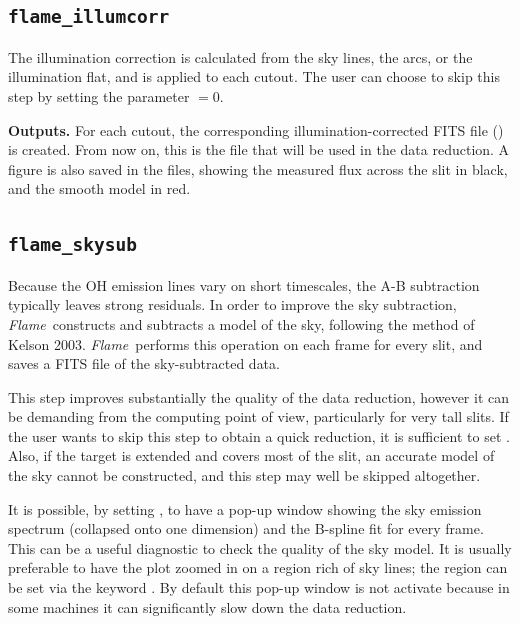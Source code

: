 \documentclass[a4paper]{article}
\newcommand{\flame}{\emph{Flame}}
\begin{document}
\begin{sloppypar}
\subsection{\texttt{flame\_illumcorr}}

The illumination correction is calculated from the sky lines, the arcs, or the illumination flat, and is applied to each cutout. The user can choose to skip this step by setting the parameter $=0$.

\medskip
\noindent
\textbf{Outputs.} For each cutout, the corresponding illumination-corrected FITS file () is created. From now on, this is the file that will be used in the data reduction. A figure is also saved in the  files, showing the measured flux across the slit in black, and the smooth model in red.



\subsection{\texttt{flame\_skysub}}

Because the OH emission lines vary on short timescales, the A-B subtraction typically leaves strong residuals. In order to improve the sky subtraction, \flame\ constructs and subtracts a model of the sky, following the method of Kelson 2003. \flame\ performs this operation on each frame for every slit, and saves a FITS file of the sky-subtracted data.

This step improves substantially the quality of the data reduction, however it can be demanding from the computing point of view, particularly for very tall slits. If the user wants to skip this step to obtain a quick reduction, it is sufficient to set . Also, if the target is extended and covers most of the slit, an accurate model of the sky cannot be constructed, and this step may well be skipped altogether.

It is possible, by setting , to have a pop-up window showing the sky emission spectrum (collapsed onto one dimension) and the B-spline fit for every frame. This can be a useful diagnostic to check the quality of the sky model. It is usually preferable to have the plot zoomed in on a region rich of sky lines; the region can be set via the keyword . By default this pop-up window is not activate because in some machines it can significantly slow down the data reduction.



\end{sloppypar}
\end{document}
